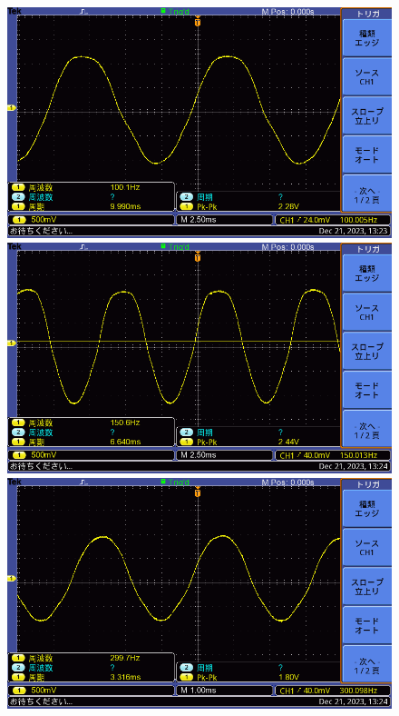 \documentclass{ltjsarticle}
\begin{document}
			\begin{figure}[H]
			\centering
			\begin{minipage}{0.4\columnwidth}
			\centering
			\includegraphics[width = \columnwidth]{figs/F0031TEK.PNG}
			\end{minipage}
			\hspace{0.04\columnwidth}
			\begin{minipage}{0.4\columnwidth}
			\centering
			\includegraphics[width = \columnwidth]{figs/F0032TEK.PNG}
			\end{minipage}
			\hspace{0.04\columnwidth}
			\begin{minipage}{0.4\columnwidth}
			\centering
			\includegraphics[width = \columnwidth]{figs/F0033TEK.PNG}

\end{minipage}
\end{figure}
\end{document}
